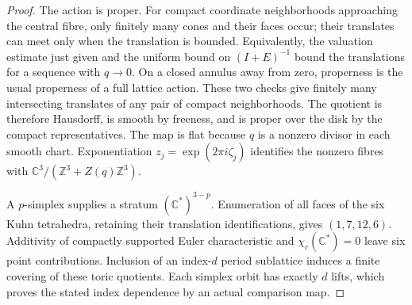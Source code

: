 \begin{proof}
The action is proper.  For compact coordinate neighborhoods approaching
the central fibre, only finitely many cones and their faces occur;
their translates can meet only when the translation is bounded.
Equivalently, the valuation estimate just given and the uniform bound
on $(I+E)^{-1}$ bound the translations for a sequence with $q\to0$.
On a closed annulus away from zero, properness is the usual
properness of a full lattice action.  These two checks give finitely
many intersecting translates of any pair of compact neighborhoods.
The quotient is therefore Hausdorff, is smooth by freeness, and is
proper over the disk by the compact representatives.  The map is flat
because $q$ is a nonzero divisor in each smooth chart.  Exponentiation
$z_j=\exp(2\pi i\zeta_j)$ identifies the nonzero fibres with
$\mathbb C^3/(\mathbb Z^3+Z(q)\mathbb Z^3)$.

A $p$-simplex supplies a stratum $(\mathbb C^*)^{3-p}$.
Enumeration of all faces of the six Kuhn tetrahedra, retaining their
translation identifications, gives $(1,7,12,6)$.
Additivity of compactly supported Euler characteristic and
$\chi_c(\mathbb C^*)=0$ leave six point contributions.
Inclusion of an index-$d$ period sublattice induces a finite covering
of these toric quotients.  Each simplex orbit has exactly $d$ lifts,
which proves the stated index dependence by an actual comparison map.
\end{proof}


